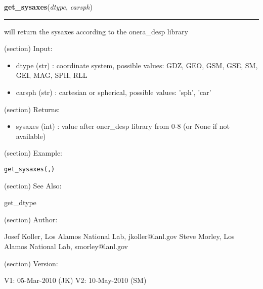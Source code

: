     \label{spacepy:onerapy:get_sysaxes}

    \vspace{0.5ex}

\hspace{.8\funcindent}\begin{boxedminipage}{\funcwidth}

    \raggedright \textbf{get\_sysaxes}(\textit{dtype}, \textit{carsph})

    \vspace{-1.5ex}

    \rule{\textwidth}{0.5\fboxrule}
\setlength{\parskip}{2ex}
    will return the sysaxes according to the onera\_desp library

    (section) Input:

      \begin{itemize}
      \setlength{\parskip}{0.6ex}
        \item dtype (str) : coordinate system, possible values: GDZ, GEO, GSM, 
          GSE, SM, GEI, MAG, SPH, RLL

        \item carsph (str) : cartesian or spherical, possible values: 'sph', 
          'car'

      \end{itemize}

    (section) Returns:

      \begin{itemize}
      \setlength{\parskip}{0.6ex}
        \item sysaxes (int) : value after oner\_desp library from 0-8 (or None 
          if not available)

      \end{itemize}

    (section) Example:

\begin{alltt}
\pysrcprompt{{\textgreater}{\textgreater}{\textgreater} }get\_sysaxes(, )
\end{alltt}
    (section) See Also:

      get\_dtype

    (section) Author:

      Josef Koller, Los Alamos National Lab, jkoller@lanl.gov Steve Morley,
      Los Alamos National Lab, smorley@lanl.gov

    (section) Version:

      V1: 05-Mar-2010 (JK) V2: 10-May-2010 (SM)

\setlength{\parskip}{1ex}
    \end{boxedminipage}

